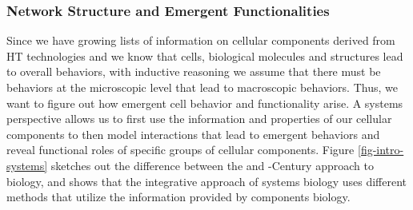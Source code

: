 \subsubsection{Network Structure and Emergent Functionalities} \label{ref:intro-emergent-function}
Since we have growing lists of information on cellular components derived from \acrshort{HT} technologies and we know that cells, biological molecules and structures lead to overall behaviors, with inductive reasoning we assume that there must be behaviors at the microscopic level that lead to macroscopic behaviors. Thus, we want to figure out how emergent cell behavior and functionality arise. A systems perspective allows us to first use the information and properties of our cellular components to then model interactions that lead to emergent behaviors and reveal functional roles of specific groups of cellular components. Figure \ref{fig-intro-systems} sketches out the difference between the  and -Century approach to biology, and shows that the integrative approach of systems biology uses different methods that utilize the information provided by components biology. 
